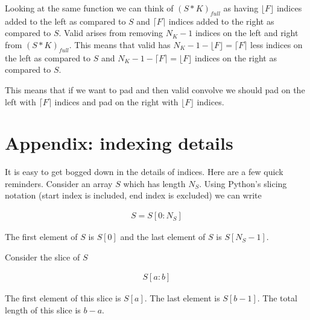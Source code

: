 \documentclass[12pt]{article}
\begin{document}
Looking at the same function we can think of $(S\ast K)_{full}$ as having $\lfloor F \rfloor$ indices added to the left as compared to $S$ and $\lceil F \rceil$ indices added to the right as compared to $S$. Valid arises from removing $N_K-1$ indices on the left and right from $(S\ast K)_{full}$. This means that valid has $N_K-1 - \lfloor F \rfloor = \lceil F \rceil$ less indices on the left as compared to $S$ and $N_K-1 - \lceil F \rceil = \lfloor F \rfloor$ indices on the right as compared to $S$.

This means that if we want to pad and then valid convolve we should pad on the left with $\lceil F \rceil$ indices and pad on the right with $\lfloor F \rfloor$ indices.

\section{Appendix: indexing details}

It is easy to get bogged down in the details of indices. Here are a few quick reminders. Consider an array $S$ which has length $N_S$. Using Python's slicing notation (start index is included, end index is excluded) we can write

\begin{align}
S = S[0:N_S]
\end{align}

The first element of $S$ is $S[0]$ and the last element of $S$ is $S[N_S-1]$.

Consider the slice of $S$ 

\begin{align}
S[a:b]
\end{align}

The first element of this slice is $S[a]$. The last element is $S[b-1]$. The total length of this slice is $b-a$.
\end{document}
